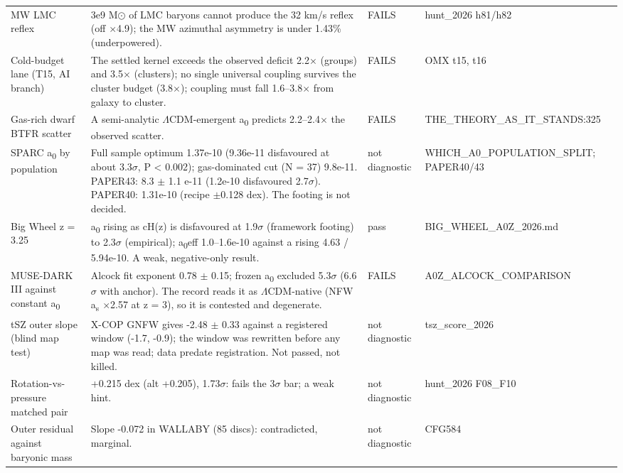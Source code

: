\documentclass[10pt]{article}
\begin{document}
{\begin{longtable}{>{\raggedright\arraybackslash}p{4.4cm}>{\raggedright\arraybackslash}p{11.6cm}>{\raggedright\arraybackslash}p{2.0cm}>{\raggedright\arraybackslash}p{3.4cm}}
MW LMC reflex & 3e9 M\ensuremath{\odot} of LMC baryons cannot produce the 32 km/s reflex (off \ensuremath{\times}4.9); the MW azimuthal asymmetry is under 1.43\% (underpowered). & FAILS & hunt\_2026 h81/h82 \\
Cold-budget lane (T15, AI branch) & The settled kernel exceeds the observed deficit 2.2\ensuremath{\times} (groups) and 3.5\ensuremath{\times} (clusters); no single universal coupling survives the cluster budget (3.8\ensuremath{\times}); coupling must fall 1.6--3.8\ensuremath{\times} from galaxy to cluster. & FAILS & OMX t15, t16 \\
Gas-rich dwarf BTFR scatter & A semi-analytic \ensuremath{\Lambda}CDM-emergent a\textsubscript{0} predicts 2.2--2.4\ensuremath{\times} the observed scatter. & FAILS & THE\_THEORY\_AS\_IT\_STANDS:325 \\
SPARC a\textsubscript{0} by population & Full sample optimum 1.37e-10 (9.36e-11 disfavoured at about 3.3\ensuremath{\sigma}, P < 0.002); gas-dominated cut (N = 37) 9.8e-11. PAPER43: 8.3 \ensuremath{\pm} 1.1 e-11 (1.2e-10 disfavoured 2.7\ensuremath{\sigma}). PAPER40: 1.31e-10 (recipe \ensuremath{\pm}0.128 dex). The footing is not decided. & not diagnostic & WHICH\_A0\_POPULATION\_SPLIT; PAPER40/43 \\
Big Wheel z = 3.25 & a\textsubscript{0} rising as cH(z) is disfavoured at 1.9\ensuremath{\sigma} (framework footing) to 2.3\ensuremath{\sigma} (empirical); a\textsubscript{0}eff 1.0--1.6e-10 against a rising 4.63 / 5.94e-10. A weak, negative-only result. & pass & BIG\_WHEEL\_A0Z\_2026.md \\
MUSE-DARK III against constant a\textsubscript{0} & Alcock fit exponent 0.78 \ensuremath{\pm} 0.15; frozen a\textsubscript{0} excluded 5.3\ensuremath{\sigma} (6.6\ensuremath{\sigma} with anchor). The record reads it as \ensuremath{\Lambda}CDM-native (NFW a\textsubscript{s} \ensuremath{\times}2.57 at z = 3), so it is contested and degenerate. & FAILS & A0Z\_ALCOCK\_COMPARISON \\
tSZ outer slope (blind map test) & X-COP GNFW gives -2.48 \ensuremath{\pm} 0.33 against a registered window (-1.7, -0.9); the window was rewritten before any map was read; data predate registration. Not passed, not killed. & not diagnostic & tsz\_score\_2026 \\
Rotation-vs-pressure matched pair & +0.215 dex (alt +0.205), 1.73\ensuremath{\sigma}: fails the 3\ensuremath{\sigma} bar; a weak hint. & not diagnostic & hunt\_2026 F08\_F10 \\
Outer residual against baryonic mass & Slope -0.072 in WALLABY (85 discs): contradicted, marginal. & not diagnostic & CFG584 \\

\end{longtable}}
\end{document}
